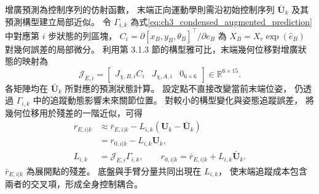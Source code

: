 增廣預測為控制序列的仿射函數，
末端正向運動學則需沿初始控制序列
$\bar{\mathbf U}_k$ 及其預測構型建立局部近似。
令 $\Gamma_{i,k}$ 為式\eqref{eq:ch3_condensed_augmented_prediction}
中對應第 $i$ 步狀態的列區塊，
$C_i=\partial[x_B,y_B,\theta_B]^\top/\partial e_B$
為 $X_B=X_r\exp(\widehat e_B)$
對幾何誤差的局部微分。
利用第 3.1.3 節的構型雅可比，末端幾何位移對增廣狀態的映射為
\begin{equation}
    \mathcal J_{E,i}=
    \begin{bmatrix}
        J_{\chi,B,i}C_i&J_{\chi,A,i}&0_{6\times6}
    \end{bmatrix}\in\mathbb R^{6\times15}.
    \label{eq:ch3_tcp_augmented_geometric_jacobian}
\end{equation}
各矩陣均在 $\bar{\mathbf U}_k$ 所對應的預測狀態計算。
設定點不直接改變當前末端位姿，
仍透過 $\Gamma_{i,k}$ 中的追蹤動態影響未來關節位置。
對較小的構型變化與姿態追蹤誤差，
將幾何位移用於殘差的一階近似，可得
\begin{equation}
    \begin{aligned}
        r_{E,i|k}
        &\approx\bar r_{E,i|k}
        -L_{i,k}(\mathbf U_k-\bar{\mathbf U}_k)\\
        &=r_{0,i|k}-L_{i,k}\mathbf U_k,\\
        L_{i,k}&=\mathcal J_{E,i}\Gamma_{i,k},\qquad
        r_{0,i|k}=\bar r_{E,i|k}+L_{i,k}\bar{\mathbf U}_k .
    \end{aligned}
    \label{eq:ch3_tcp_affine_residual}
\end{equation}
$\bar r_{E,i|k}$ 為展開點的殘差。
底盤與手臂分量共同出現在 $L_{i,k}$，
使末端追蹤成本包含兩者的交叉項，形成全身控制耦合。

